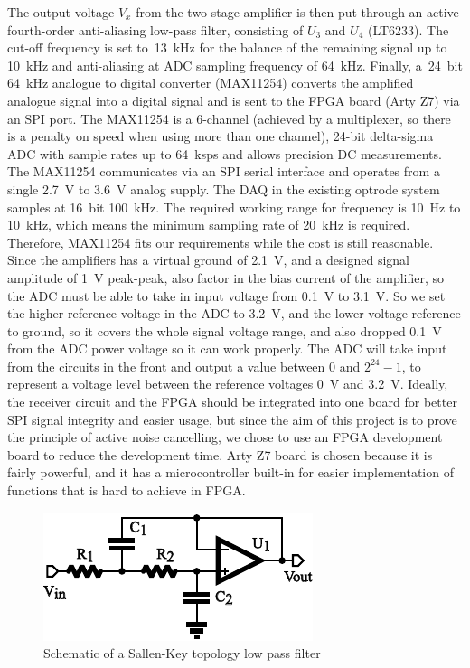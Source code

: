 The output voltage $V_x$ from the two-stage amplifier is then put through an active fourth-order anti-aliasing low-pass filter, consisting of $U_3$ and $U_4$ (LT6233).  The cut-off frequency is set to~\qty{13}{kHz} for the balance of the remaining signal up to \qty{10}{kHz} and anti-aliasing at ADC sampling frequency of \qty{64}{kHz}. Finally, a~\qty{24}{bit} \qty{64}{kHz} analogue to digital converter (MAX11254) converts the amplified analogue signal into a digital signal and is sent to the FPGA board (Arty Z7) via an SPI port.  The MAX11254 is a 6-channel (achieved by a multiplexer, so there is a penalty on speed when using more than one channel), 24-bit delta-sigma ADC with sample rates up to \qty{64}{ksps} and allows precision DC measurements. The MAX11254 communicates via an SPI serial interface and operates from a single \qty{2.7}{V} to \qty{3.6}{V} analog supply.  The DAQ in the existing optrode system samples at \qty{16}{bit} \qty{100}{kHz}.  The required working range for frequency is \qty{10}{Hz} to \qty{10}{kHz}, which means the minimum sampling rate of \qty{20}{kHz} is required.  Therefore, MAX11254 fits our requirements while the cost is still reasonable.  Since the amplifiers has a virtual ground of \qty{2.1}{V}, and a designed signal amplitude of \qty{1}{V} peak-peak, also factor in the bias current of the amplifier, so the ADC must be able to take in input voltage from \qty{0.1}{V} to \qty{3.1}{V}.  So we set the higher reference voltage in the ADC to \qty{3.2}{V}, and the lower voltage reference to ground, so it covers the whole signal voltage range, and also dropped \qty{0.1}{V} from the ADC power voltage so it can work properly.  The ADC will take input from the circuits in the front and output a value between $0$ and $2^{24}-1$, to represent a voltage level between the reference voltages \qty{0}{V} and \qty{3.2}{V}.  Ideally, the receiver circuit and the FPGA should be integrated into one board for better SPI signal integrity and easier usage, but since the aim of this project is to prove the principle of active noise cancelling, we chose to use an FPGA development board to reduce the development time.  Arty Z7 board is chosen because it is fairly powerful, and it has a microcontroller built-in for easier implementation of functions that is hard to achieve in FPGA.

\begin{figure}[H]
\centerline{\includegraphics[scale=1]{4-ANC_Sys/SallenKeyLPF.pdf}}
\caption{Schematic of a Sallen-Key topology low pass filter}
\label{fig_SallenKeyLPF}
\end{figure}

